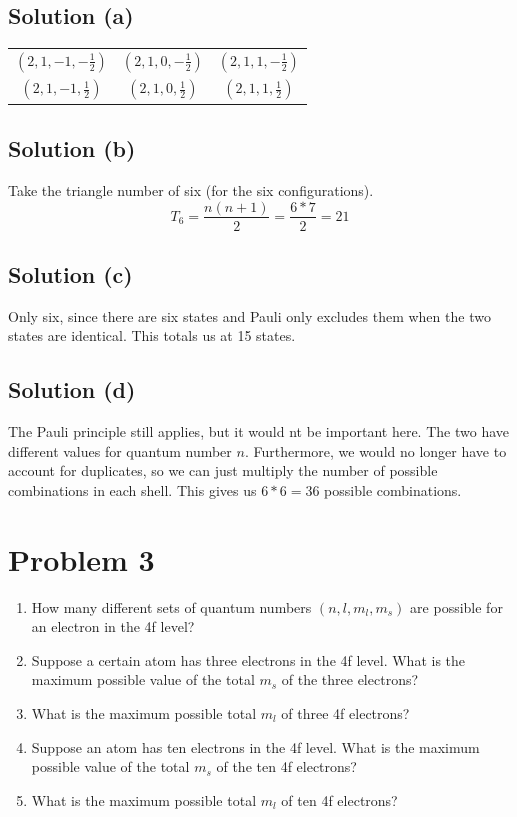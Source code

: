 \documentclass[12pt]{report}
\begin{document}
\subsection{Solution (a)}
    \begin{tabular}{c c c}
        $(2, 1, -1, -\frac{1}{2})$ & $(2, 1, 0, -\frac{1}{2})$ & $(2, 1, 1, -\frac{1}{2})$\\
        $(2, 1, -1, \frac{1}{2})$ & $(2, 1, 0, \frac{1}{2})$ & $(2, 1, 1, \frac{1}{2})$
    \end{tabular}

\subsection{Solution (b)}
    Take the triangle number of six (for the six configurations).
    \begin{equation}
        T_6 = \frac{n(n+1)}{2}
            =   \frac{6*7}{2}
            =   \boxed{21}
    \end{equation}

\subsection{Solution (c)}
    Only six, since there are six states and Pauli only excludes them when the two states are identical.
    This totals us at 15 states.

\subsection{Solution (d)}
    The Pauli principle still applies, but it would nt be important here. 
    The two have different values for quantum number $n$.
    Furthermore, we would no longer have to account for duplicates, so we can just multiply the number of possible combinations in each shell.
    This gives us $6 * 6 = \boxed{36}$ possible combinations.
\pagebreak

\section{Problem 3}
\begin{enumerate}[label=(\alph*)]
    \item   How many different sets of quantum numbers $(n, l, m_l, m_s)$ are possible for an electron in the 4f level?
    \item   Suppose a certain atom has three electrons in the 4f level. What is the maximum possible value of the total $m_s$ of the three electrons?
    \item   What is the maximum possible total $m_l$ of three 4f electrons?
    \item   Suppose an atom has ten electrons in the 4f level. What is the maximum possible value of the total $m_s$ of the ten 4f electrons?
    \item   What is the maximum possible total $m_l$ of ten 4f electrons?
\end{enumerate}
\end{document}
